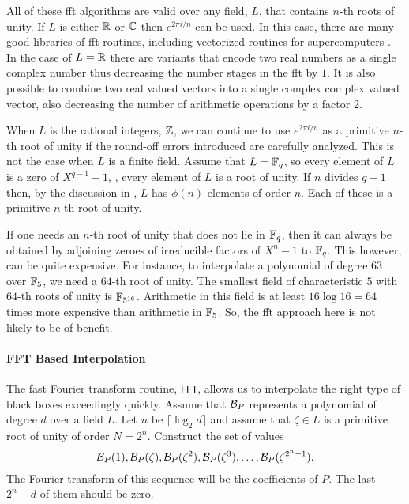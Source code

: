 All of these {\sc fft} algorithms are valid over any field, $L$, that
contains $n$-th roots of unity.  If $L$ is either $\mathbb{R}$ or $\mathbb{C}$ then
$e^{2\pi i/n}$ can be used.  In this case, there are many good
libraries of {\sc fft} routines, including vectorized routines for
supercomputers \cite{Swarztrauber1984-zd,Bailey1988-ay,Bailey1988-rv}.  In the case
of $L = \mathbb{R}$ there are variants that encode two real numbers as a
single complex number thus decreasing the number stages in the {\sc fft} by
$1$.  It is also possible to combine two real valued vectors into a
single complex complex valued vector, also decreasing the number of
arithmetic operations by a factor 2. 

When $L$ is the rational integers, $\mathbb{Z}$, we can continue to use
$e^{2\pi i/n}$ as a primitive $n$-th root of unity if the round-off
errors introduced are carefully analyzed.  This is not the case when
$L$ is a finite field.  Assume that $L = \mathbb{F}_q$, so every element of
$L$ is a zero of $X^{q-1} - 1$, \ie, every element of $L$ is a root of
unity.  If $n$ divides $q-1$ then, by the discussion in
, $L$ has $\phi(n)$ elements of order
$n$.  Each of these is a primitive $n$-th root of unity.   

If one needs an $n$-th root of unity that does not lie in $\mathbb{F}_q$,
then it can always be obtained by adjoining zeroes of irreducible
factors of $X^n-1$ to $\mathbb{F}_q$.  This however, can be quite expensive.
For instance, to interpolate a polynomial of degree $63$ over $\mathbb{F}_5$,
we need a $64$-th root of unity.  The smallest field of
characteristic $5$ with $64$-th roots of unity is $\mathbb{F}_{5^{16}}$.
Arithmetic in this field is at least $16 \log 16 = 64$ times more
expensive than arithmetic in $\mathbb{F}_5$.  So, the {\sc fft} approach here
is not likely to be of benefit.

\paragraph{FFT Based Interpolation}

The fast Fourier transform routine, {\tt FFT}, allows us to
interpolate the right type of black boxes exceedingly quickly.  Assume
that ${\cal B}_P$ represents a polynomial of degree $d$ over a field
$L$.  Let $n$ be $\lceil \log_2 d \rceil$ and assume that $\zeta \in
L$ is a primitive root of unity of
order $N = 2^n$.  Construct the set of values
\[
{\cal B}_P(1), {\cal B}_P(\zeta), {\cal B}_P(\zeta^2), {\cal
B}_P(\zeta^3), \ldots, {\cal B}_P(\zeta^{2^n-1}).
\]
The Fourier transform of this sequence will be the coefficients of
$P$.  The last $2^n - d$ of them should be zero.

